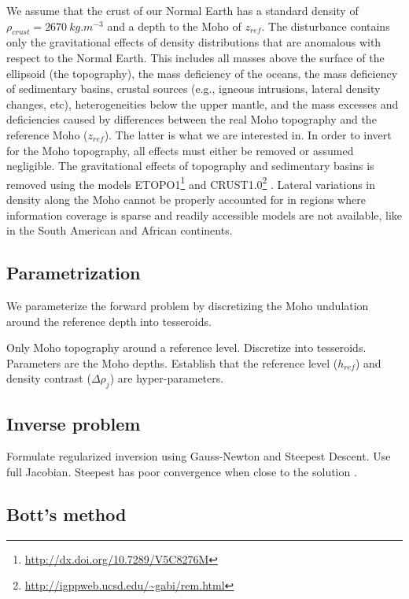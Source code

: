 \documentclass[extra]{gji}
\begin{document}
We assume that the crust of our Normal Earth has a standard density of
$\rho_{crust} = 2670\ kg.m^{-3}$ and a depth to the Moho of $z_{ref}$.
The disturbance contains only the gravitational effects of density
distributions that are anomalous with respect to the Normal Earth.
This includes all masses above the surface of the ellipsoid (the topography),
the mass deficiency of the oceans,
the mass deficiency of sedimentary basins,
crustal sources (e.g., igneous intrusions, lateral density changes, etc),
heterogeneities below the upper mantle,
and
the mass excesses and deficiencies caused by differences between the real Moho
topography and the reference Moho ($z_{ref}$).
The latter is what we are interested in.
In order to invert for the Moho topography, all effects must either be removed
or assumed negligible.
The gravitational effects of topography and sedimentary basins is
removed using the models
ETOPO1\footnote{\url{http://dx.doi.org/10.7289/V5C8276M}}
\citep{amante_c._and_b._w._eakins_etopo1_2009}
and CRUST1.0\footnote{\url{http://igppweb.ucsd.edu/~gabi/rem.html}}
\citep{laske_update_2013}.
Lateral variations in density along the Moho cannot be properly accounted for
in regions where information coverage is sparse and readily accessible models
are not available, like in the South American and African continents.


\subsection{Parametrization}


We parameterize the forward problem by discretizing the Moho undulation around
the reference depth into tesseroids.


Only Moho topography around a reference level.
Discretize into tesseroids.
Parameters are the Moho depths.
Establish that the reference level ($h_{ref}$)  and density contrast
($\Delta\rho_j$) are hyper-parameters.

\subsection{Inverse problem}

Formulate regularized inversion using Gauss-Newton and Steepest Descent.
Use full Jacobian.
Steepest has poor convergence when close to the solution
\citep{kelley_iterative_1987}.

\subsection{Bott's method}
\end{document}
